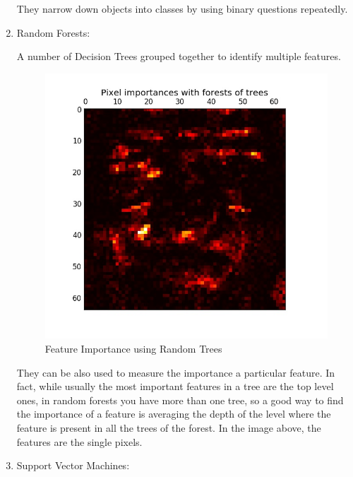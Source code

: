 \begin{enumerate}
		They narrow down objects into classes by using binary questions repeatedly.
	\item Random Forests:
		
		A number of Decision Trees grouped together to identify multiple features.
		\begin{figure}[H]
			\centering
			\includegraphics[scale=0.4]{images/featureimportance.jpg}
			\caption{Feature Importance using Random Trees}
			\label{f:featureimportance}
		\end{figure}
		They can be also used to measure the importance a particular feature. In fact, while usually the most important features in a tree are the top level ones, in random forests you have more than one tree, so a good way to find the importance of a feature is averaging the depth of the level where the feature is present in all the trees of the forest. In the image above, the features are the single pixels.
	\item Support Vector Machines:
	

\end{enumerate}
